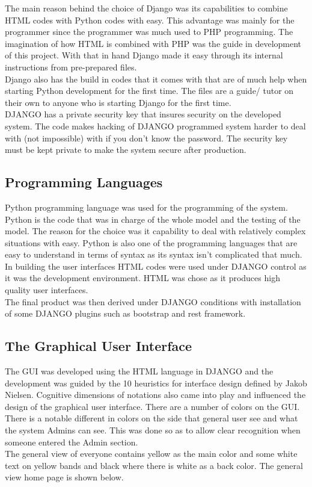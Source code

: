 \documentclass[12pt]{report}
\begin{document}
	The main reason behind the choice of Django was its capabilities to combine HTML codes with Python codes with easy. This advantage was mainly for the programmer since the programmer was much used to PHP programming. The imagination of how HTML is combined with PHP was the guide in development of this project. With that in hand Django made it easy through its internal instructions from pre-prepared files.\\
	
	Django also has the build in codes that it comes with that are of much help when starting Python development for the first time. The files are a guide/ tutor on their own to anyone who is starting Django for the first time.\\
	
	DJANGO has a private security key that insures security on the developed system. The code makes hacking of DJANGO programmed system harder to deal with (not impossible) with if you don’t know the password. The security key must be kept private to make the system secure after production.\\
	
	\subsection{Programming Languages}
	Python programming language was used for the programming of the system. Python is the code that was in charge of the whole model and the testing of the model. The reason for the choice was it capability to deal with relatively complex situations with easy. Python is also one of the programming languages that are easy to understand in terms of syntax as its syntax isn’t complicated that much.\\
	
	In building the user interfaces HTML codes were used under DJANGO control as it was the development environment. HTML was chose as it produces high quality user interfaces.\\
	
	The final product was then derived under DJANGO conditions with installation of some DJANGO plugins such as bootstrap and rest framework.\\
	
	\subsection{The Graphical User Interface}
	The GUI was developed using the HTML language in DJANGO and the development was guided by the 10 heuristics for interface design defined by Jakob Nielsen. Cognitive dimensions of notations also came into play and influenced the design of the graphical user interface. There are a number of colors on the GUI. There is a notable different in colors on the side that general user see and what the system Admins can see. This was done so as to allow clear recognition when someone entered the Admin section.\\
	The general view of everyone contains yellow as the main color and some white text on yellow bands and black where there is white as a back color. The general view home page is shown below.\\
	
\end{document}
